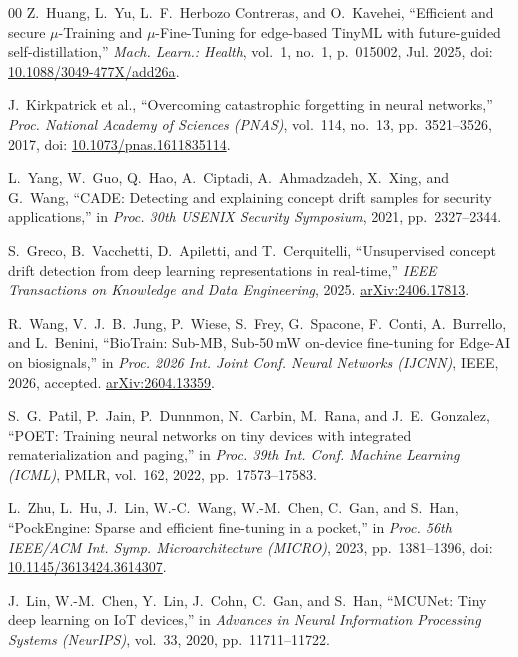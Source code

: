 \documentclass[conference]{IEEEtran}
\begin{document}
\begin{thebibliography}{00}
Z.~Huang, L.~Yu, L.~F.~Herbozo Contreras, and O.~Kavehei,
``Efficient and secure $\mu$-Training and $\mu$-Fine-Tuning for
edge-based TinyML with future-guided self-distillation,''
\textit{Mach. Learn.: Health}, vol.~1, no.~1, p.~015002, Jul. 2025,
doi: \href{https://doi.org/10.1088/3049-477X/add26a}{10.1088/3049-477X/add26a}.

J.~Kirkpatrick et al.,
``Overcoming catastrophic forgetting in neural networks,''
\textit{Proc. National Academy of Sciences (PNAS)},
vol.~114, no.~13, pp.~3521--3526, 2017,
doi: \href{https://doi.org/10.1073/pnas.1611835114}{10.1073/pnas.1611835114}.

L.~Yang, W.~Guo, Q.~Hao, A.~Ciptadi, A.~Ahmadzadeh, X.~Xing,
and G.~Wang,
``CADE: Detecting and explaining concept drift samples for
security applications,''
in \textit{Proc. 30th USENIX Security Symposium}, 2021,
pp.~2327--2344.

S.~Greco, B.~Vacchetti, D.~Apiletti, and T.~Cerquitelli,
``Unsupervised concept drift detection from deep learning
representations in real-time,''
\textit{IEEE Transactions on Knowledge and Data Engineering},
2025. \href{https://arxiv.org/abs/2406.17813}{arXiv:2406.17813}.

R.~Wang, V.~J.~B.~Jung, P.~Wiese, S.~Frey, G.~Spacone,
F.~Conti, A.~Burrello, and L.~Benini,
``BioTrain: Sub-MB, Sub-50\,mW on-device fine-tuning for Edge-AI on
biosignals,''
in \textit{Proc. 2026 Int. Joint Conf. Neural Networks (IJCNN)},
IEEE, 2026, accepted. \href{https://arxiv.org/abs/2604.13359}{arXiv:2604.13359}.

S.~G.~Patil, P.~Jain, P.~Dunnmon, N.~Carbin, M.~Rana, and
J.~E.~Gonzalez,
``POET: Training neural networks on tiny devices with integrated
rematerialization and paging,''
in \textit{Proc. 39th Int. Conf. Machine Learning (ICML)},
PMLR, vol.~162, 2022, pp.~17573--17583.

L.~Zhu, L.~Hu, J.~Lin, W.-C.~Wang, W.-M.~Chen, C.~Gan, and
S.~Han,
``PockEngine: Sparse and efficient fine-tuning in a pocket,''
in \textit{Proc. 56th IEEE/ACM Int. Symp. Microarchitecture
(MICRO)}, 2023, pp.~1381--1396,
doi: \href{https://doi.org/10.1145/3613424.3614307}{10.1145/3613424.3614307}.

J.~Lin, W.-M.~Chen, Y.~Lin, J.~Cohn, C.~Gan, and S.~Han,
``MCUNet: Tiny deep learning on IoT devices,''
in \textit{Advances in Neural Information Processing Systems
(NeurIPS)}, vol.~33, 2020, pp.~11711--11722.


\end{thebibliography}
\end{document}
